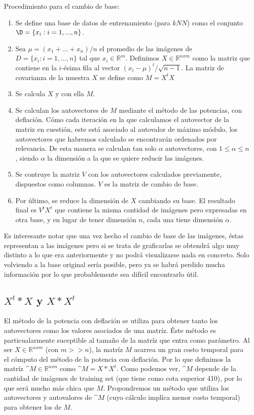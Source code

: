 \bigskip

Procedimiento para el cambio de base:

\begin{enumerate}
\item Se define una base de datos de entrenamiento (para $kNN$) como el conjunto $\D = \{x_i : i = 1, . . . , n\}$.
\item Sea $\mu = (x_1 + ... + x_n)/n$ el promedio de las imágenes de $D = \{x_i : i = 1, ..., n\}$ tal que $x_i\in\mathbb{R}^{m}$. Definimos $X\in\mathbb{R}^{nxm}$ como la matriz que contiene en la $i$-ésima fila al vector $(x_i - \mu)^t/  \sqrt{n-1}$. La matriz de covarianza de la muestra $X$ se define como $M = X^t X$
\item Se calcula $X$ y con ella $M$.
\item Se calculan los autovectores de $M$ mediante el método de las potencias, con deflación. Cómo cada iteración en la que calculamos el autovector de la matriz en cuestión, este está asociado al autovalor de máximo módulo, los autovectores que habremos calculado se encontrarán ordenados por relevancia. De esta manera se calculan tan solo $\alpha$ autovectores, con $1 \leq \alpha \leq n$, siendo $\alpha$ la dimensión a la que se quiere reducir las imágenes. 
\item Se contruye la matriz $V$ con los autovectores calculados previamente, dispuestos como columnas. $V$ es la matriz de cambio de base.
\item Por último, se reduce la dimensión de $X$ cambiando su base. El resultado final es $V^tX^t$ que contiene la misma cantidad de imágenes pero expresadas en otra base, y en lugar de tener dimensión $n$, cada una tiene dimensión $\alpha$.
\end{enumerate}\tabularnewline

Es interesante notar que una vez hecho el cambio de base de las imágenes, éstas representan a las imágenes pero si se trata de graficarlas se obtendrá algo muy distinto a lo que era anteriormente y no podrá visualizarse nada en concreto. Solo volviendo a la base original sería posible, pero ya se habrá perdido mucha información por lo que probablemente sea difícil encontrarlo útil.


\subsection{$X^t*X$ y $X*X^t$}
El método de la potencia con deflación se utiliza para obtener tanto los autovectores como los valores asociados de una matríz. Éste método es particualarmente suceptible al tamaño de la matríz que entra como parámetro. Al ser $X\in\mathbb{R}^{nxm}$ (con $m >> n$), la matríz $M$ acarrea un gran costo temporal para el cómputo del método de la potencia con deflación. Por lo que definimos la matríz $\^{M}\in\mathbb{R}^{nxn}$ como $\^{M}=X*X^t$. Como podemos ver, $\^{M}$ depende de la cantidad de imágenes de training set (que tiene como cota superior 410), por lo que será mucho más chica que $M$. Propondremos un método que utiliza los autovectores y autovalores de $\^{M}$ (cuyo cálculo implíca menor costo temporal) para obtener los de $M$.

